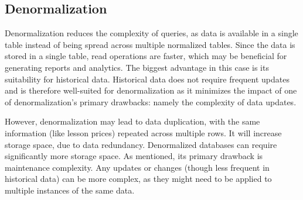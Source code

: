 \documentclass[a4paper]{scrartcl}
\begin{document}
\subsection*{Denormalization}
Denormalization reduces the complexity of queries,
as data is available in a single table instead of being spread across multiple normalized tables.
Since the data is stored in a single table, read operations are faster,
which may be beneficial for generating reports and analytics.
The biggest advantage in this case is its suitability for historical data.
Historical data does not require frequent updates and is therefore
well-suited for denormalization as it minimizes the impact of one of denormalization's primary drawbacks:
namely the complexity of data updates.

However, denormalization may lead to data duplication,
with the same information (like lesson prices) repeated across multiple rows.
It will increase storage space, due to
data redundancy.
Denormalized databases can require significantly more storage space.
As mentioned, its primary drawback is maintenance complexity.
Any updates or changes
(though less frequent in historical data) can be more complex,
as they might need to be applied to multiple instances of the same data.


\end{document}
